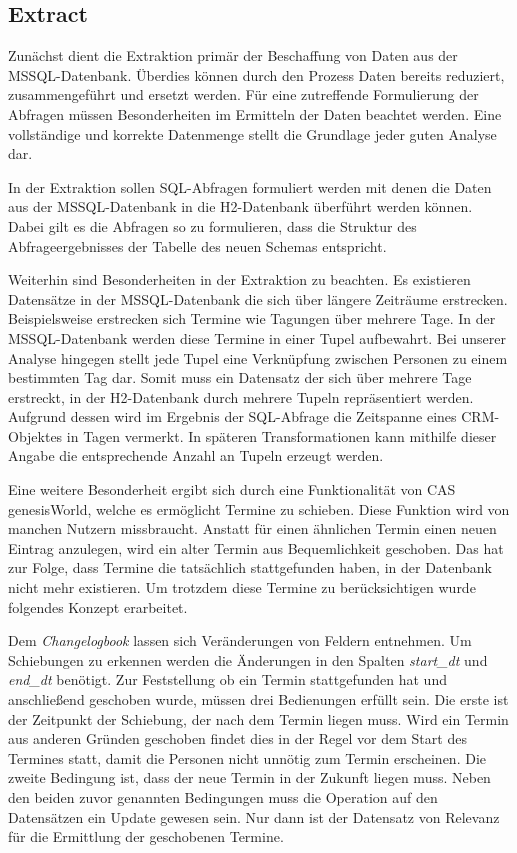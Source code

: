 \subsection{Extract}
\label{ch:konzeption:etl:extract}

Zunächst dient die Extraktion primär der Beschaffung von Daten aus der MSSQL-Datenbank. Überdies können durch den Prozess Daten bereits reduziert,  zusammengeführt und ersetzt werden. Für eine zutreffende Formulierung der Abfragen müssen Besonderheiten im Ermitteln der Daten beachtet werden. Eine vollständige und korrekte Datenmenge stellt die Grundlage jeder guten Analyse dar.

In der Extraktion sollen SQL-Abfragen formuliert werden mit denen die Daten aus der MSSQL-Datenbank in die H2-Datenbank überführt werden können. Dabei gilt es die Abfragen so zu formulieren, dass die Struktur des Abfrageergebnisses der Tabelle des neuen Schemas entspricht.

Weiterhin sind Besonderheiten in der Extraktion zu beachten. Es existieren Datensätze in der MSSQL-Datenbank die sich über längere Zeiträume erstrecken. Beispielsweise erstrecken sich Termine wie Tagungen über mehrere Tage. In der MSSQL-Datenbank werden diese Termine in einer Tupel aufbewahrt. Bei unserer Analyse hingegen stellt jede Tupel eine Verknüpfung zwischen Personen zu einem bestimmten Tag dar. Somit muss ein Datensatz der sich über mehrere Tage erstreckt, in der H2-Datenbank durch mehrere Tupeln repräsentiert werden. Aufgrund dessen wird im Ergebnis der SQL-Abfrage die Zeitspanne eines CRM-Objektes in Tagen vermerkt. In späteren Transformationen kann mithilfe dieser Angabe die entsprechende Anzahl an Tupeln erzeugt werden.

Eine weitere Besonderheit ergibt sich durch eine Funktionalität von CAS genesisWorld, welche es ermöglicht Termine zu schieben. Diese Funktion wird von manchen Nutzern missbraucht. Anstatt für einen ähnlichen Termin einen neuen Eintrag anzulegen, wird ein alter Termin aus Bequemlichkeit geschoben. Das hat zur Folge, dass Termine die tatsächlich stattgefunden haben, in der Datenbank nicht mehr existieren. Um trotzdem diese Termine zu berücksichtigen wurde folgendes Konzept erarbeitet. 

Dem \textit{Changelogbook} lassen sich Veränderungen von Feldern entnehmen. Um Schiebungen zu erkennen werden die Änderungen in den Spalten \textit{start\_dt} und \textit{end\_dt} benötigt. Zur Feststellung ob ein Termin stattgefunden hat und anschließend geschoben wurde, müssen drei Bedienungen erfüllt sein. Die erste ist der Zeitpunkt der Schiebung, der nach dem Termin liegen muss. Wird ein Termin aus anderen Gründen geschoben findet dies in der Regel vor dem Start des Termines statt, damit die Personen nicht unnötig zum Termin erscheinen. Die zweite Bedingung ist, dass der neue Termin in der Zukunft liegen muss. Neben den beiden zuvor genannten Bedingungen muss die Operation auf den Datensätzen ein Update gewesen sein. Nur dann ist der Datensatz von Relevanz für die Ermittlung der geschobenen Termine. 

